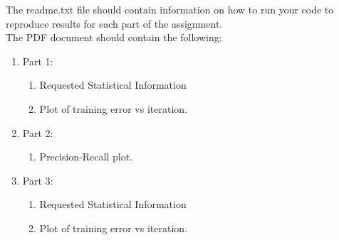 \documentclass[12pt]{article}
\begin{document}
\noindent
The readme.txt file should contain information on how to run your code to reproduce results for each part of the assignment.\\

\noindent
The PDF document should contain the following:

\begin{enumerate}
\item Part 1:
	\begin{enumerate}
		\item Requested Statistical Information
		\item Plot of training error vs iteration.
	\end{enumerate}
\item Part 2:
	\begin{enumerate}
		\item Precision-Recall plot.
	\end{enumerate}
\item Part 3:
	\begin{enumerate}
		\item Requested Statistical Information
		\item Plot of training error vs iteration.
	\end{enumerate}
\end{enumerate}
\end{document}

